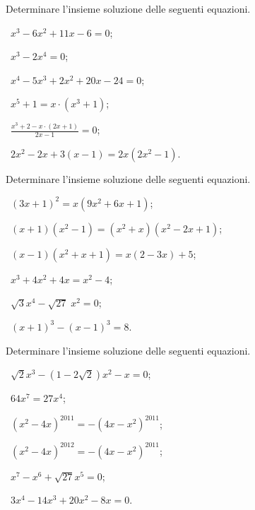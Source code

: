 \begin{esercizio}[\Ast]
 \label{ese:5.7}
Determinare l'insieme soluzione delle seguenti equazioni.
\begin{multicols}{2}
 \begin{enumeratea}
 \item~$x^3-6x^2+11x-6=0$;
 \item~$x^3-2x^4=0$;
 \item~$x^4-5x^3+2x^2+20x-24=0$;
 \item~$x^5+1=x\cdot \left(x^3+1\right)$;
 \item~$\frac{x^3+2-x\cdot (2x+1)}{2x-1}=0$;
 \item~$2x^2-2x+3(x-1)=2x\left(2x^2-1\right)$.
 \end{enumeratea}
 \end{multicols}
\end{esercizio}
\newpage
\begin{esercizio}[\Ast]
 \label{ese:5.8}
Determinare l'insieme soluzione delle seguenti equazioni.
 \begin{enumeratea}
 \item~$(3x+1)^2=x\left(9x^2+6x+1\right)$;
 \item~$(x+1)\left(x^2-1\right)=\left(x^2+x\right)\left(x^2-2x+1\right)$;
 \item~$(x-1)(x^2+x+1)=x(2-3x)+5$;
 \item~$x^3+4x^2+4x=x^2-4$;
 \item~$\sqrt 3 x^4-\sqrt{27}\;x^2=0$;
 \item~$ (x+1)^3-(x-1)^3=8 $.
 \end{enumeratea}
\end{esercizio}

\begin{esercizio}[\Ast]
 \label{ese:5.9}
Determinare l'insieme soluzione delle seguenti equazioni.
\begin{multicols}{2}
 \begin{enumeratea}
 \item~$\sqrt 2x^3-(1-2\sqrt 2)x^2-x=0$;
 \item~$64x^7=27x^4$;
 \item~$(x^2-4x)^{2011}=-(4x-x^2)^{2011}$;
 \item~$(x^2-4x)^{2012}=-(4x-x^2)^{2011}$;
 \item~$x^7-x^6+\sqrt{27}x^5=0$;
 \item~$3x^4-14x^3+20x^2-8x=0$.
 \end{enumeratea}
 \end{multicols}
\end{esercizio}

